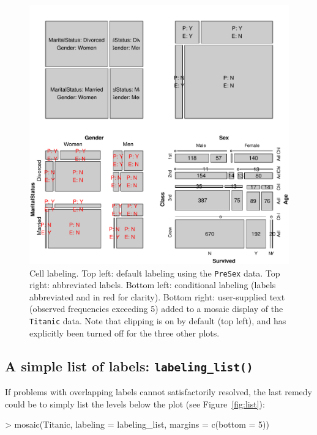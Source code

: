 \documentclass{Z}
\newcommand{\data}[1]{\texttt{#1}}
\begin{document}
\begin{figure}[p]
\begin{center}
\includegraphics{strucplot-label3fig}
\caption{Cell labeling. Top left: default labeling using the
  \data{PreSex} data. Top right: abbreviated labels. Bottom left:
  conditional labeling (labels abbreviated and in red for clarity).
  Bottom right: user-supplied text (observed frequencies exceeding 5) 
  added to a mosaic display of the \data{Titanic} data. Note that
  clipping is on by default (top left), and has explicitly been turned
  off for the three other plots.}
\label{fig:labels3}
\end{center}
\end{figure}

\subsection[A simple list of labels]{A simple list of labels: \texttt{labeling\_list()}}

If problems with overlapping labels cannot satisfactorily resolved,
the last remedy could be to simply list the levels below the plot
(see Figure~\ref{fig:list}):

\begin{Schunk}
\begin{Sinput}
> mosaic(Titanic, labeling = labeling_list, margins = c(bottom = 5))
\end{Sinput}
\end{Schunk}
\end{document}
